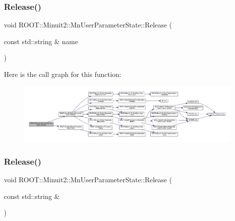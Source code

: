 \mbox{\label{classROOT_1_1Minuit2_1_1MnUserParameterState_ae35c9bfa1e967c16542143a99a6f03eb}} 
\subsubsection{\texorpdfstring{Release()}{Release()}\hspace{0.1cm}{\footnotesize\ttfamily [4/6]}}
{\footnotesize\ttfamily void R\+O\+O\+T\+::\+Minuit2\+::\+Mn\+User\+Parameter\+State\+::\+Release (\begin{DoxyParamCaption}\item[{const std\+::string \&}]{name }\end{DoxyParamCaption})}

Here is the call graph for this function\+:
\nopagebreak
\begin{figure}[H]
\begin{center}
\leavevmode
\includegraphics[width=350pt]{d3/de0/classROOT_1_1Minuit2_1_1MnUserParameterState_ae35c9bfa1e967c16542143a99a6f03eb_cgraph}
\end{center}
\end{figure}
\mbox{\label{classROOT_1_1Minuit2_1_1MnUserParameterState_ae35c9bfa1e967c16542143a99a6f03eb}} 
\subsubsection{\texorpdfstring{Release()}{Release()}\hspace{0.1cm}{\footnotesize\ttfamily [5/6]}}
{\footnotesize\ttfamily void R\+O\+O\+T\+::\+Minuit2\+::\+Mn\+User\+Parameter\+State\+::\+Release (\begin{DoxyParamCaption}\item[{const std\+::string \&}]{ }\end{DoxyParamCaption})}

